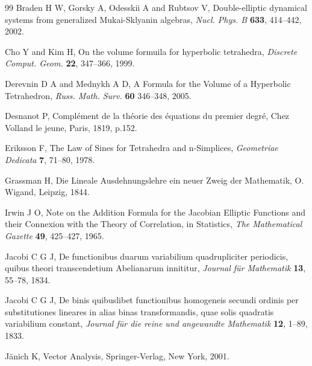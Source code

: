 \documentclass[fleqn,11pt,twoside]{article}
\theoremstyle{definition}
\begin{document}
\begin{thebibliography}{99}
Braden H W, Gorsky A, Odesskii A and Rubtsov V, Double-elliptic 
dynamical systems from generalized Mukai-Sklyanin algebras,  
{\it Nucl. Phys. B} {\bf 633}, 414--442, 2002.
 
Cho Y and Kim H, On the volume formuila for hyperbolic tetrahedra,
{\it Discrete Comput. Geom.} {\bf 22}, 347--366, 1999. 


Derevnin D A and Mednykh A D, A Formula for the Volume of a Hyperbolic Tetrahedron, 
{\it Russ. Math. Surv.} {\bf 60} 346--348, 2005.


Desnanot P, Compl\'ement de la th\'eorie des \'equations du 
premier degr\'e, Chez Volland le jeune, Paris, 1819, p.152.

Eriksson F, The Law of Sines for Tetrahedra and n-Simplices, 
{\it Geometriae Dedicata} {\bf 7}, 71--80, 1978.




Grassman H, Die Lineale Ausdehnungslehre ein neuer Zweig der Mathematik, O. Wigand,
Leipzig, 1844.

Irwin J O, Note on the Addition Formula for the Jacobian Elliptic Functions and their
Connexion with the Theory of Correlation, in Statistics, {\it 
The Mathematical Gazette} {\bf 49}, 425--427, 1965. 

Jacobi C G J, De functionibus duarum variabilium quadrupliciter periodicis, quibus theori
transcendetium Abelianarum innititur, {\it Journal f\"ur Mathematik} {\bf 13}, 
55--78, 1834.

Jacobi C G J, De binis quibuslibet functionibus homogeneis secundi ordinis per substitutiones 
lineares in alias binas transformandis, quae solis quadratis variabilium constant,  
{\it Journal f\"ur die reine und angewandte Mathematik} {\bf 12}, 1--89, 1833.  

J\"anich K, Vector Analysis, Springer-Verlag, New York, 2001. 


\end{thebibliography}
\end{document}
